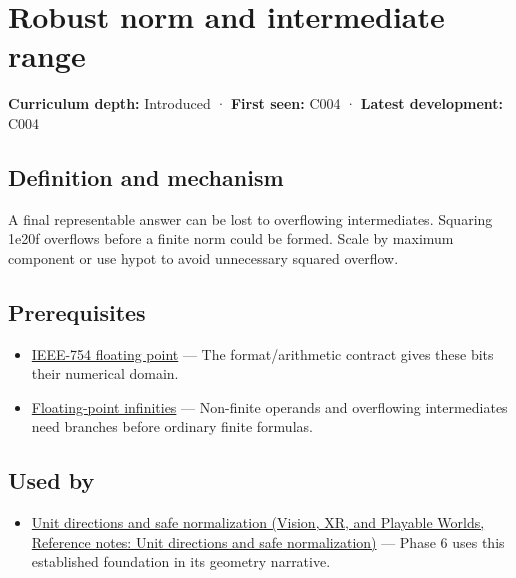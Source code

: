 \hypertarget{appendix-7f1e17dcafb1}{}\label{referencestart:appendix-7f1e17dcafb1}
\section{Robust norm and intermediate range}\label{appendix-7f1e17dcafb1-robust-norm-and-intermediate-range}

\textbf{Curriculum depth:} Introduced · \textbf{First seen:} C004 · \textbf{Latest development:} C004

\subsection{Definition and mechanism}\label{appendix-7f1e17dcafb1-definition-and-mechanism}

A final representable answer can be lost to overflowing intermediates. Squaring 1e20f overflows before a finite norm could be formed. Scale by maximum component or use hypot to avoid unnecessary squared overflow.

\subsection{Prerequisites}\label{appendix-7f1e17dcafb1-prerequisites}

\begin{itemize}
\tightlist
\item
  \hyperref[appendix-343615f49ddf]{IEEE-754 floating point} --- The format/arithmetic contract gives these bits their numerical domain.
\item
  \hyperref[appendix-eb336149c00a]{Floating-point infinities} --- Non-finite operands and overflowing intermediates need branches before ordinary finite formulas.
\end{itemize}

\subsection{Used by}\label{appendix-7f1e17dcafb1-used-by}

\begin{itemize}
\tightlist
\item
  \href{../07-Vision-XR-and-Playable-Worlds/main.pdf\#nameddest=appendix-f744e41b95b4}{Unit directions and safe normalization (Vision, XR, and Playable Worlds, Reference notes: Unit directions and safe normalization)} --- Phase 6 uses this established foundation in its geometry narrative.
\end{itemize}

